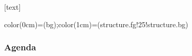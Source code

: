 \usepackage{layout/beamerthemePI}
\usepackage{tikz}

\graphicspath{{images/}}

[text]

\usepackage{hyperref}
\makeatletter
{}
\makeatother




 {color(0cm)=(bg);color(1cm)=(structure.fg!25!structure.bg)}

\begingroup
\makeatletter
\setlength{\hoffset}{-25pt}
\addtocounter{framenumber}{-1}
\beamertemplatenavigationsymbolsempty
\makeatother
\begin{frame}[plain]
    \titlepage
    
\end{frame}
\endgroup

\setcounter{tocdepth}{1}

\begingroup
\makeatletter
{}
\makeatother
\begin{frame}
  \frametitle{Agenda}
  \tableofcontents
\end{frame}
\endgroup

\AtBeginSection[]%
{%
\frame{\sectionpage}
\addtocounter{framenumber}{-1}
}

\allSections


